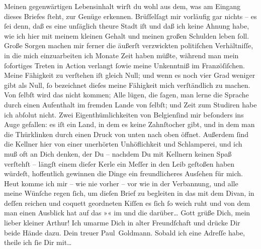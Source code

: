 \pstart
           Meinen gegenwärtigen Lebensinhalt wirſt du wohl aus dem, was am Eingang dieses
               Briefes{ }ſteht, zur Genüge erkennen. Brüſſelſagt
               mir vorläufig gar nichts – es{ }ſei denn, daß es eine unſäglich theure Stadt iſt und daß ich keine Ahnung habe, wie
               ich hier mit meinem kleinen Gehalt und meinen großen Schulden leben{ }ſoll. Große
               Sorgen machen mir ferner die äußerſt verzwickten politiſchen Verhältniſſe, in die
               mich einzuarbeiten ich Monate Zeit haben müßte, während man {\pb}mein{ }ſofortiges Treten in Action verlangt{ }ſowie
               meine Unkenntniß im Franzöſiſchen. Meine Fähigkeit zu verſtehen iſt gleich Null; und
               wenn es noch vier Grad weniger gibt als Null,{ }ſo bezeichnet dieſes meine Fähigkeit
               mich verſtändlich zu machen. Von{ }ſelbſt wird das nicht kommen; Alle lügen, die{ }ſagen,
               man lerne die Sprache durch einen Aufenthalt im fremden Lande von{ }ſelbſt; und Zeit
               zum Studiren habe ich abſolut nicht. Zwei Eigenthümlichkeiten von Belgienſind mir beſonders ins Auge gefallen: es iſt ein Land, in dem es keine
               Zahnſtocher gibt, und in dem man die Thürklinken durch einen Druck von unten nach
               oben öffnet. Außerdem{ }ſind die Kellner hier von einer unerhörten Unhöflichkeit und
               Schlamperei, und ich muß oft an Dich denken, der Du – nachdem Du mit Kellnern keinen
               Spaß verſtehſt – längſt einem dieſer Kerle ein Meſſer in den Leib geſtoßen haben
               würdeſt, hoffentlich gewinnen die Dinge ein freundlicheres Ausſehen für mich. Heut komme ich mir – wie nie vorher – vor wie in der
               Verbannung, und alle meine Wünſche regen{ }ſich, um dieſen Brief zu begleiten in das
                  \label{K_L02663-7v}\label{K_L02663-7} mit dem Divan, in deſſen reichen und coquett geordneten Kiſſen es{ }ſich{ }ſo weich ruht und von dem man einen Ausblick hat auf das »\label{K_L02663-8v}\label{K_L02663-8}« im \label{K_L02663-9v}\label{K_L02663-9} und die \label{K_L02663-10v}\label{K_L02663-10} darüber{\dots} Gott grüße Dich,
               mein lieber kleiner Arthur! Ich umarme Dich in alter Freundſchaft und drücke Dir
               beide Hände dazu.\pend
           \pstart Dein treuer \spacefill\mbox{Paul Goldmann.}\pend{}
\pstart
           \noindent{}Sobald ich eine Adreſſe habe, theile ich{ }ſie Dir mit{\dots}\pend
           
